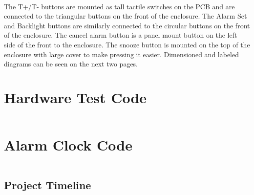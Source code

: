 \documentclass{article}
\begin{document}
\paragraph{}
The T+/T- buttons are mounted as tall tactile switches on the PCB and are connected to the triangular buttons on the front of the enclosure. The Alarm Set and Backlight buttons are similarly connected to the circular buttons on the front of the enclosure. The cancel alarm button is a panel mount button on the left side of the front to the enclosure. The snooze button is mounted on the top of the enclosure with large cover to make pressing it easier. Dimensioned and labeled diagrams can be seen on the next two pages.

\newpage


\section{Hardware Test Code}
\inputminted{cpp}{..\ Code\ Test.ino}
\newpage
\section{Alarm Clock Code}
\inputminted{cpp}{..\ Code\ AlarmCode.ino}

\begin{landscape}
    \section{Project Timeline}
    \thispagestyle{empty}
    \noindent{}
        \vfill
{\makebox[\linewidth]{\thepage}}
\end{landscape}
\end{document}
